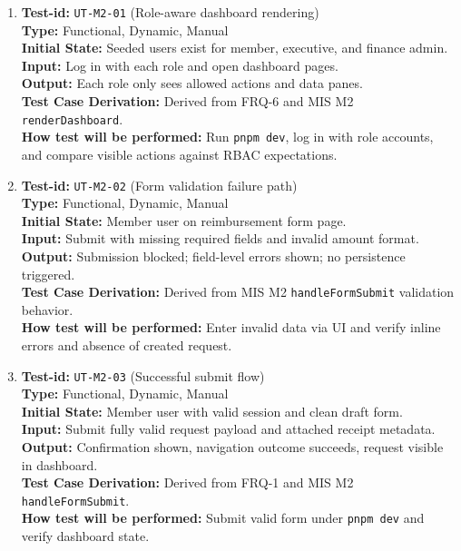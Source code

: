 \documentclass[12pt, titlepage]{article}
\begin{document}
\begin{enumerate}

\item \textbf{Test-id:} \texttt{UT-M2-01} (Role-aware dashboard rendering)\\
\textbf{Type:} Functional, Dynamic, Manual\\
\textbf{Initial State:} Seeded users exist for member, executive, and finance admin.\\
\textbf{Input:} Log in with each role and open dashboard pages.\\
\textbf{Output:} Each role only sees allowed actions and data panes.\\
\textbf{Test Case Derivation:} Derived from FRQ-6 and MIS M2 \texttt{renderDashboard}.\\
\textbf{How test will be performed:} Run \texttt{pnpm dev}, log in with role accounts, and compare visible actions against RBAC expectations.

\item \textbf{Test-id:} \texttt{UT-M2-02} (Form validation failure path)\\
\textbf{Type:} Functional, Dynamic, Manual\\
\textbf{Initial State:} Member user on reimbursement form page.\\
\textbf{Input:} Submit with missing required fields and invalid amount format.\\
\textbf{Output:} Submission blocked; field-level errors shown; no persistence triggered.\\
\textbf{Test Case Derivation:} Derived from MIS M2 \texttt{handleFormSubmit} validation behavior.\\
\textbf{How test will be performed:} Enter invalid data via UI and verify inline errors and absence of created request.

\item \textbf{Test-id:} \texttt{UT-M2-03} (Successful submit flow)\\
\textbf{Type:} Functional, Dynamic, Manual\\
\textbf{Initial State:} Member user with valid session and clean draft form.\\
\textbf{Input:} Submit fully valid request payload and attached receipt metadata.\\
\textbf{Output:} Confirmation shown, navigation outcome succeeds, request visible in dashboard.\\
\textbf{Test Case Derivation:} Derived from FRQ-1 and MIS M2 \texttt{handleFormSubmit}.\\
\textbf{How test will be performed:} Submit valid form under \texttt{pnpm dev} and verify dashboard state.

\end{enumerate}
\end{document}
